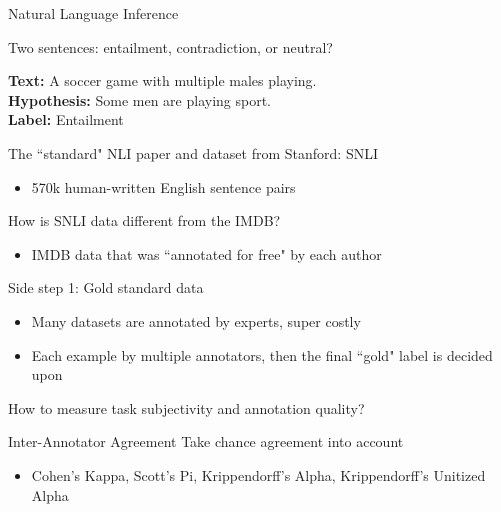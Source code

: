 \documentclass[12pt,aspectratio=169,handout]{beamer}
\begin{document}
\begin{frame}{Natural Language Inference}

Two sentences: entailment, contradiction, or neutral?

\begin{example}
\textbf{Text:} A soccer game with multiple males playing. \\
\textbf{Hypothesis:} Some men are playing sport. \\
\textbf{Label:} Entailment
\end{example}


The ``standard" NLI paper and dataset from Stanford: SNLI

\begin{itemize}
	\item 570k human-written English sentence pairs
\end{itemize}

How is SNLI data different from the IMDB?

\begin{itemize}
	\item IMDB data that was ``annotated for free" by each author
\end{itemize}



\end{frame}

\begin{frame}{Side step 1: Gold standard data}

\begin{itemize}
	\item Many datasets are annotated by experts, super costly
	\item Each example by multiple annotators, then the final ``gold" label is decided upon
\end{itemize}

\bigskip

How to measure task subjectivity and annotation quality?

\begin{block}{Inter-Annotator Agreement}
Take chance agreement into account
\begin{itemize}
	\item Cohen's Kappa, Scott's Pi, Krippendorff's Alpha, Krippendorff's Unitized Alpha \citep{Artstein.Poesio.2008.CoLi}
\end{itemize}
	
\end{block}


\end{frame}
\end{document}
